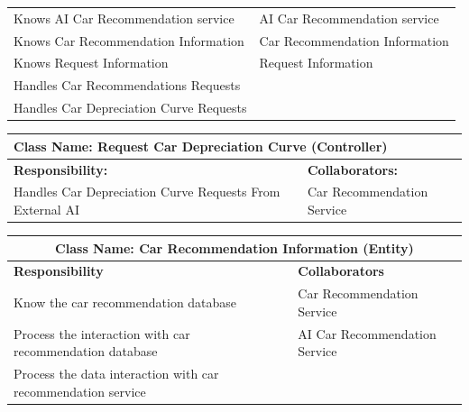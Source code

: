 \documentclass[]{article}
\begin{document}
\begin{itemize}
\begin{table}[H]
\begin{tabular}{|p{6cm}|p{6cm}|}
                Knows AI Car Recommendation service & AI Car Recommendation service \\
                Knows Car Recommendation Information & Car Recommendation Information \\
                Knows Request Information & Request Information \\
                Handles Car Recommendations Requests &  \\
                Handles Car Depreciation Curve Requests &  \\
                \hline
            \end{tabular}
        \end{table}
        \begin{table}[H]
            \centering
            \begin{tabular}{|p{6cm}|p{6cm}|}
                \hline 
                \multicolumn{2}{|l|}{\textbf{Class Name: Request Car Depreciation Curve (Controller)}} \\
                \hline
                \textbf{Responsibility:} & \textbf{Collaborators:} \\
                \hline
                Handles Car Depreciation Curve Requests From External AI & Car Recommendation Service \\
                \hline
            \end{tabular}
        \end{table}
        \begin{table}[H]
            \centering
            \begin{tabular}{|p{6cm}|p{6cm}|}
            \hline 
             \multicolumn{2}{|c|}{\textbf{Class Name: Car Recommendation Information (Entity)}} \\
            \hline
            \textbf{Responsibility} & \textbf{Collaborators} \\
            \hline
            Know the car recommendation database & Car Recommendation Service \\
            Process the interaction with car recommendation database & AI Car Recommendation Service \\
            Process the data interaction with car recommendation service & \\
            \hline
            \end{tabular}
        \end{table}
        \begin{table}[H]
            \centering
            \begin{tabular}{|p{6cm}|p{6cm}|}

\end{tabular}
\end{table}
\end{itemize}
\end{document}
